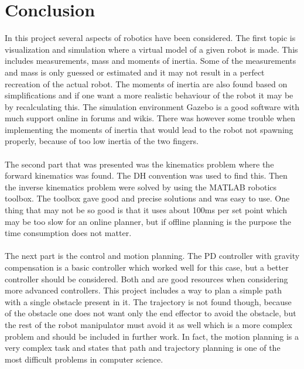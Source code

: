 \chapter{Conclusion}
In this project several aspects of robotics have been considered. The first topic is visualization and simulation where a virtual model of a given robot is made. This includes measurements, mass and moments of inertia. Some of the measurements and mass is only guessed or estimated and it may not result in a perfect recreation of the actual robot. The moments of inertia are also found based on simplifications and if one want a more realistic behaviour of the robot it may be by recalculating this. The simulation environment Gazebo is a good software with much support online in forums and wikis. There was however some trouble when implementing the moments of inertia that would lead to the robot not spawning properly, because of too low inertia of the two fingers.\\\\
The second part that was presented was the kinematics problem where the forward kinematics was found. The DH convention was used to find this. Then the inverse kinematics problem were solved by using the MATLAB robotics toolbox\cite{MatlabRobTool}. The toolbox gave good and precise solutions and was easy to use. One thing that may not be so good is that it uses about 100ms per set point which may be too slow for an online planner\cite{spong}, but if offline planning is the purpose the time consumption does not matter.
\\\\
The next part is the control and motion planning. The PD controller with gravity compensation is a basic controller which worked well for this case, but a better controller should be considered. Both \cite{spong} and \cite{Siciliano} are good resources when considering more advanced controllers. This project includes a way to plan a simple path with a single obstacle present in it. The trajectory is not found though, because of the obstacle one does not want only the end effector to avoid the obstacle, but the rest of the robot manipulator must avoid it as well which is a more complex problem and should be included in further work. In fact, the motion planning is a very complex task and \cite{spong} states that path and trajectory planning is one of the most difficult problems in computer science.